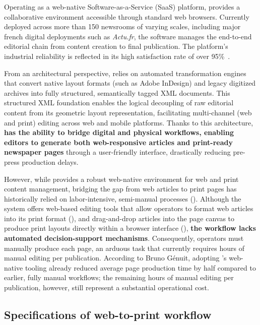 Operating as a web-native Software-as-a-Service (SaaS) platform, \melody provides a collaborative environment accessible through standard web browsers. Currently deployed across more than 150 newsrooms of varying scales, including major french digital deployments such as \emph{Actu.fr}, the software manages the end-to-end editorial chain from content creation to final publication. The platform's industrial reliability is reflected in its high satisfaction rate of over 95\%~\cite{melody}. 

From an architectural perspective, \melody relies on automated transformation engines that convert native layout formats (such as Adobe InDesign) and legacy digitized archives into fully structured, semantically tagged XML documents. This structured XML foundation enables the logical decoupling of raw editorial content from its geometric layout representation, facilitating multi-channel (web and print) editing across web and mobile platforms. Thanks to this architecture, \textbf{\melody has the ability to bridge digital and physical workflows, enabling editors to generate both web-responsive articles and print-ready newspaper pages} through a user-friendly interface, drastically reducing pre-press production delays. 

However, while \melody provides a robust web-native environment for web and print content management, bridging the gap from  web articles to print pages has historically relied on labor-intensive, semi-manual processes (). Although the system offers web-based editing tools that allow operators to format web articles into its print format (), and drag-and-drop articles into the page canvas to produce print layouts directly within a browser interface (), \textbf{the workflow lacks automated decision-support mechanisms}. Consequently, operators must manually  produce each page, an arduous task that currently requires hours of manual editing per publication. According to Bruno Génuit, adopting \melody's web-native tooling already reduced average page production time by half compared to earlier, fully manual workflows; the remaining hours of manual editing per publication, however, still represent a substantial operational cost.



\subsection{Specifications of \melody web-to-print workflow}
